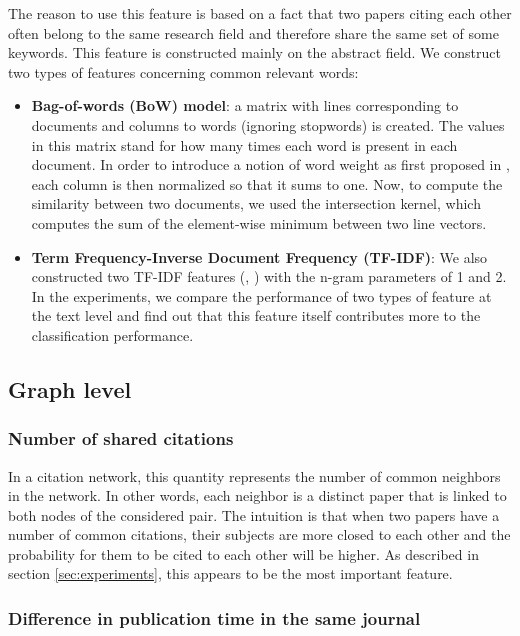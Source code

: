 \documentclass{article}
\begin{document}
The reason to use this feature is based on a fact that two papers citing each other often belong to the same research field and therefore share the same set of some keywords. This feature is constructed mainly on the abstract field. We construct two types of features concerning common relevant words:
\begin{itemize}
\item \textbf{Bag-of-words (BoW) model}: a matrix with lines corresponding to documents and columns to words (ignoring stopwords) is created. The values in this matrix stand for how many times each word is present in each document. In order to introduce a notion of word weight as first proposed in \cite{sparck1972statistical}, each column is then normalized so that it sums to one. Now, to compute the similarity between two documents, we used the intersection kernel, which computes the sum of the element-wise minimum between two line vectors.
\item \textbf{Term Frequency-Inverse Document Frequency (TF-IDF)}: We also constructed two TF-IDF features (\cite{Singhal:1996}, \cite{Wu:2008}) with the n-gram parameters of 1 and 2. In the experiments, we compare the performance of two types of feature at the text level and find out that this feature itself contributes more to the classification performance.
\end{itemize}
\subsection{Graph level}
\subsubsection{Number of shared citations}

In a citation network, this quantity represents the number of common neighbors in the network. In other words, each neighbor is a distinct paper that is linked to both nodes of the considered pair. The intuition is that when two papers have a number of common citations, their subjects are more closed to each other and the probability for them to be cited to each other will be higher. As described in section \ref{sec:experiments}, this appears to be the most important feature.

\subsubsection{Difference in publication time in the same journal}
\end{document}
